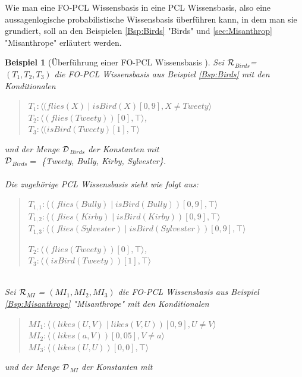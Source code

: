 \documentclass[draft]{scrreprt}
\newtheorem{Bsp}{Beispiel}[section]
\begin{document}
	Wie man eine FO-PCL Wissensbasis in eine PCL Wissensbasis, also eine aussagenlogische probabilistische Wissensbasis überführen kann, in dem man sie grundiert, soll an den Beispielen  \ref{Bsp:Birds} "{}Birds"{} und \ref{sec:Misanthrop} "{}Misanthrope"{}  erläutert werden.
\begin{Bsp}[Überführung einer FO-PCL Wissensbasis ]

	Sei $ \cal{R} $$_{Birds} $= \\ $ (T_1, T_2, T_3)  $ die FO-PCL Wissensbasis aus Beispiel  \ref{Bsp:Birds} mit den Konditionalen 
	\begin{quote}
	$ T_{1} : \langle (flies(X) \mid isBird(X)[0,9], X \neq Tweety \rangle$\\
	$ T_{2}  :  \langle (flies(Tweety))[0], \top \rangle $,\\
	$ T_{3} : \langle (isBird(Tweety) [1], \top \rangle$\\

	\end{quote}
	und der Menge $ \cal{D} $$_{Birds}  $ der Konstanten mit\\
	$ \cal{D} $$_{Birds} = $ \{Tweety, Bully, Kirby, Sylvester\}. \\
	\\
	Die zugehörige PCL Wissensbasis sieht wie folgt aus:
	\begin{quote}
	$ T_{1,1} : \langle (flies(Bully) \mid isBird(Bully))[0,9], \top \rangle$\\
	$ T_{1,2} : \langle (flies(Kirby) \mid isBird(Kirby))[0,9], \top \rangle$\\
	$ T_{1,3} : \langle (flies(Sylvester) \mid isBird(Sylvester))[0,9], \top \rangle$
		
	$ T_{2}  :  \langle (flies(Tweety))[0], \top \rangle $,\\
	$ T_{3} : \langle (isBird(Tweety))[1], \top \rangle$\\

	\end{quote}
	\noindent
	\\
	Sei $ \cal{R} $$_{MI} $ = $ (MI_1, MI_2, MI_3)  $ die FO-PCL Wissensbasis aus Beispiel \ref{Bsp:Misanthrope} "{}Misanthrope"{} mit den Konditionalen 
	\begin{quote}
	$ MI_1 : \langle (likes(U, V) \mid likes(V, U))[0,9], U \neq V \rangle$\\
	$ MI_2 : \langle (likes(a, V))[0,05], V \neq a \rangle$\\
	$ MI_{3} : \langle (likes(U, U))[0,0], \top \rangle$\\
	\end{quote}
	und der Menge $ \cal{D} $$_{MI}  $ der Konstanten mit
	

\end{Bsp}
\end{document}
